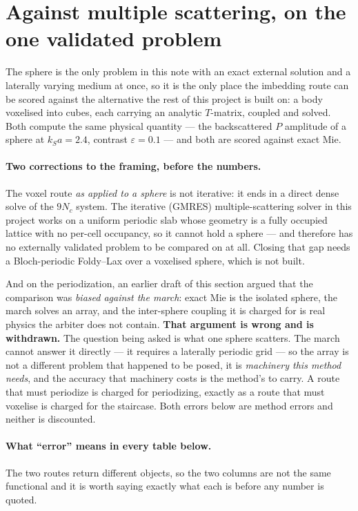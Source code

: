 \documentclass[11pt,a4paper]{article}
\begin{document}
\section{Against multiple scattering, on the one validated
problem}\label{sec:vsfoldy}

The sphere is the only problem in this note with an exact external solution and
a laterally varying medium at once, so it is the only place the imbedding route
can be scored against the alternative the rest of this project is built on: a
body voxelised into cubes, each carrying an analytic $T$-matrix, coupled and
solved.  Both compute the same physical quantity --- the backscattered $P$
amplitude of a sphere at $k_Sa=2.4$, contrast $\varepsilon=0.1$ --- and both are
scored against exact Mie.

\paragraph{Two corrections to the framing, before the numbers.}  The voxel route
\emph{as applied to a sphere} is not iterative: it ends in a direct dense solve
of the $9N_c$ system.  The iterative (GMRES) multiple-scattering solver in this
project works on a uniform periodic slab whose geometry is a fully occupied
lattice with no per-cell occupancy, so it cannot hold a sphere --- and therefore
has no externally validated problem to be compared on at all.  Closing that gap
needs a Bloch-periodic Foldy--Lax over a voxelised sphere, which is not built.

And on the periodization, an earlier draft of this section argued that the
comparison was \emph{biased against the march}: exact Mie is the isolated
sphere, the march solves an array, and the inter-sphere coupling it is charged
for is real physics the arbiter does not contain.  \textbf{That argument is
wrong and is withdrawn.}  The question being asked is what one sphere
scatters.  The march cannot answer it directly --- it requires a laterally
periodic grid --- so the array is not a different problem that happened to be
posed, it is \emph{machinery this method needs}, and the accuracy that
machinery costs is the method's to carry.  A route that must periodize is
charged for periodizing, exactly as a route that must voxelise is charged for
the staircase.  Both errors below are method errors and neither is discounted.

\paragraph{What ``error'' means in every table below.}  The two routes return
different objects, so the two columns are not the same functional and it is
worth saying exactly what each is before any number is quoted.
\end{document}
